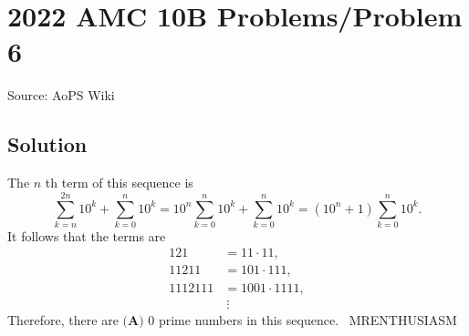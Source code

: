 \documentclass[12pt]{article}
\begin{document}
\section*{{2022 AMC 10B Problems/Problem 6}}
Source: AoPS Wiki

\subsection*{Solution}
The $n$ th term of this sequence is \[\sum_{k=n}^{2n}10^k + \sum_{k=0}^{n}10^k = 10^n\sum_{k=0}^{n}10^k + \sum_{k=0}^{n}10^k = \left(10^n+1\right)\sum_{k=0}^{n}10^k.\] It follows that the terms are \begin{align*} 121 &= 11\cdot11, \\ 11211 &= 101\cdot111, \\ 1112111 &= 1001\cdot1111, \\ & \ \vdots \end{align*} Therefore, there are $\boxed{\textbf{(A) } 0}$ prime numbers in this sequence. ~MRENTHUSIASM
\end{document}
